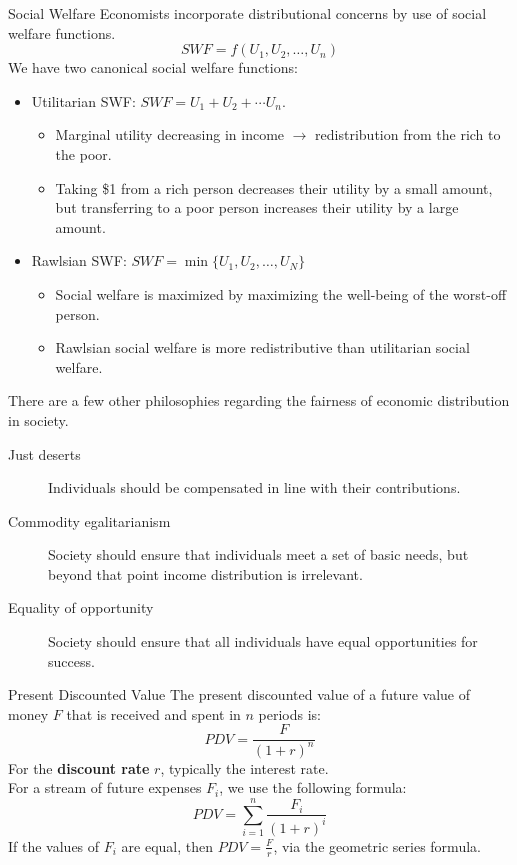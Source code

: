 \documentclass[8pt]{extarticle}
\begin{document}
  \begin{problem}{Social Welfare}
    Economists incorporate distributional concerns by use of social welfare functions.
    \[
      SWF = f(U_1,U_2,\dots,U_n)
    \] 
    We have two canonical social welfare functions:
    \begin{itemize}
      \item Utilitarian SWF: $SWF = U_1 + U_2 + \cdots U_n$.
      \begin{itemize}
        \item Marginal utility decreasing in income $\rightarrow$ redistribution from the rich to the poor.
        \item Taking \$1 from a rich person decreases their utility by a small amount, but transferring to a poor person increases their utility by a large amount.
      \end{itemize}
      \item Rawlsian SWF: $SWF = \min\{U_1,U_2,\dots,U_N\}$
      \begin{itemize}
        \item Social welfare is maximized by maximizing the well-being of the worst-off person.
        \item Rawlsian social welfare is more redistributive than utilitarian social welfare.
      \end{itemize}
    \end{itemize}
    There are a few other philosophies regarding the fairness of economic distribution in society.
    \begin{description}
      \item[Just deserts] Individuals should be compensated in line with their contributions.
      \item[Commodity egalitarianism] Society should ensure that individuals meet a set of basic needs, but beyond that point income distribution is irrelevant.
      \item[Equality of opportunity] Society should ensure that all individuals have equal opportunities for success.
    \end{description}
  \end{problem}
  \begin{problem}{Present Discounted Value}
    The present discounted value of a future value of money $F$ that is received and spent in $n$ periods is:
    \[
      PDV = \frac{F}{(1+r)^n}
    \] 
    For the \textbf{discount rate} $r$, typically the interest rate.\\

    For a stream of future expenses $F_i$, we use the following formula:
    \[
      PDV = \sum_{i = 1}^{n} \frac{F_i}{(1+r)^i}
    \] 
    If the values of $F_i$ are equal, then $PDV = \frac{F}{r}$, via the geometric series formula.
  \end{problem}
\end{document}
